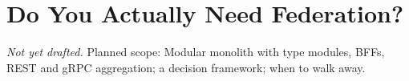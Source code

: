 \chapter{Do You Actually Need Federation?}
\label{ch:do-you-actually-need-federation}

\emph{Not yet drafted.} Planned scope: Modular monolith with type modules, BFFs, REST and gRPC aggregation; a decision framework; when to walk away.

% 
